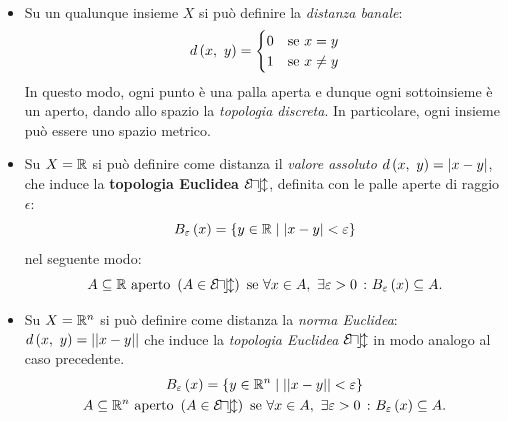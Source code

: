 \begin{examples}~{}
	\begin{itemize}
		\item Su un qualunque insieme $X$ si può definire la \textit{distanza banale}:
		\begin{equation}
			d\left(x,\ y\right)=\begin{cases} 
				0 & \text{se }x=y\\
				1 & \text{se }x\neq y
			\end{cases}
		\end{equation}
		In questo modo, ogni punto è una palla aperta e dunque ogni sottoinsieme è un aperto, dando allo spazio la \textit{topologia discreta}. In particolare, ogni insieme può essere uno spazio metrico.
		\item Su $X=\mathbb{R}$ si può definire come distanza il \textit{valore assoluto} $d\left(x,\ y\right)=\left|x-y\right|$, che induce la \textbf{topologia Euclidea} $\mathcal{E\! u\! c\! l}$, definita con le palle aperte di raggio $\epsilon$:
		\begin{equation}
			B_{\varepsilon}\left(x\right)=\left\{y\in \mathbb{R}\mid \left|x-y\right|<\varepsilon\right\}
		\end{equation}
		nel seguente modo:
		\begin{equation*}
			A\subseteq \mathbb{R} \text{ aperto } \left(A\in\mathcal{E\! u\! c\! l}\right) \text{ se } \forall x\in A,\ \exists \varepsilon>0\ \colon B_{\varepsilon}\left(x\right)\subseteq A.
		\end{equation*}
		\item Su $X=\mathbb{R}^n$ si può definire come distanza la \textit{norma Euclidea}: $d\left(x,\ y\right)=\left|\left| x-y\right|\right|$ che induce la \textit{topologia Euclidea} $\mathcal{E\! u\! c\! l}$ in modo analogo al caso precedente.
		\begin{gather*}
			B_{\varepsilon}\left(x\right)=\left\{y\in \mathbb{R}^n\mid \left|\left| x-y\right|\right|<\varepsilon\right\}\\
			A\subseteq \mathbb{R}^n \text{ aperto } \left(A\in\mathcal{E\! u\! c\! l}\right) \text{ se } \forall x\in A,\ \exists \varepsilon>0\ \colon B_{\varepsilon}\left(x\right)\subseteq A.
		\end{gather*}
	\end{itemize}
\vspace{-6mm}
\end{examples}
